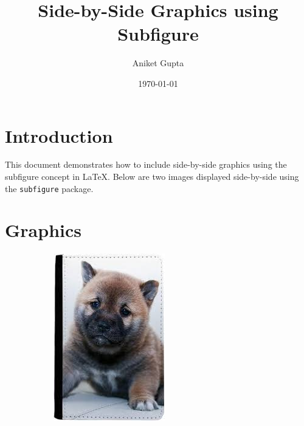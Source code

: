 \documentclass{article}
\title{Side-by-Side Graphics using Subfigure}
\author{Aniket Gupta}
\date{\today}
\begin{document}
\maketitle

\section{Introduction}
This document demonstrates how to include side-by-side graphics using the subfigure concept in LaTeX. Below are two images displayed side-by-side using the \texttt{subfigure} package.

\section{Graphics}
\begin{figure}[h!]
    \centering
    \begin{subfigure}{0.45\textwidth}
        \centering
        \includegraphics[width=\linewidth]{piggy dog.jpeg}

\end{subfigure}
\end{figure}
\end{document}
